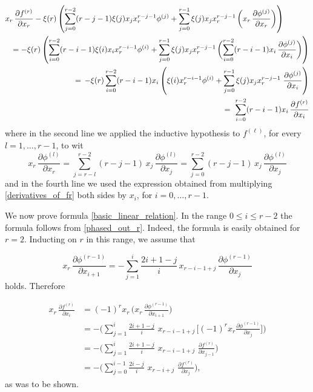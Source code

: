 \documentclass[11pt]{article}   %
\theoremstyle{definition}
\numberwithin{Theorem}{section} \numberwithin{equation}{section}
\begin{document}
{\begin{eqnarray*}\label{derivative_of_order_last}
\lefteqn{ x_r\,\frac{\partial f^{(r)}}{\partial x_r} -\xi(r)\left(\sum_{j=0}^{r-2}(r-j-1)\xi({j}) x_j
x_r^{r-j-1}\phi^{(j)} +\sum_{j=0}^{r-1}\xi({j}) x_j x_r^{r-j-1}\,
\biggl(x_r\,\frac{\partial \phi^{(j)}}{\partial x_r}\biggr)\right)}\\
&&=-\xi(r)\left(\sum_{i=0}^{r-2}(r-i-1)\xi(i)x_ix_r^{r-i-1}\phi^{(i)}+
    \sum_{j=0}^{r-1}\xi({j}) x_j x_r^{r-j-1}\, \biggl(\sum_{i=0}^{r-2} (r-i-1)x_i\,
    \frac{\partial \phi^{(j)}}{\partial x_i}\biggr) \right)\\
&&=\,-\xi(r)\sum_{i=0}^{r-2}(r-i-1)x_i\left(\xi(i)x_r^{r-i-1}\phi^{(i)}+
    \sum_{j=0}^{r-1}\xi({j}) x_j x_r^{r-j-1}\, \,
    \frac{\partial \phi^{(j)}}{\partial x_i} \right)\\
    && =\,\,\sum_{i=0}^{r-2}(r-i-1)x_i\, \frac{\partial
f^{(r)}}{\partial x_i}
\end{eqnarray*}
where in the second line we applied the inductive hypothesis to $f^ {(\ell)}$,
for every $l=1,\ldots, r-1$, to wit
\begin{equation}\label{exact_linear_relation_for_induction}
x_r\, \frac{\partial \phi^{(l)}}{\partial
x_r}=\sum_{j=r-l}^{r-2}(r-j-1)\,x_j\,\frac{\partial
\phi^{(l)}}{\partial x_j}=\sum_{j=0}^{r-2}(r-j-1)\,x_j\,\frac{\partial
\phi^{(l)}}{\partial x_j}
\end{equation}
and in the fourth line we used the expression
obtained from multiplying \eqref{derivatives_of_fr} both sides by
$x_i$, for $i=0,\ldots, r-1$.

We now prove formula \eqref{basic_linear_relation}. In the range
$0\leq i\leq r-2$ the formula follows from \eqref{phased_out_r}.
Indeed, the formula is easily obtained for $r=2$. Inducting on $r$
in this range, we assume that

\begin{equation}\label{basic_linear_relation_shifted}
x_r\,\frac{\partial \phi^{(r-1)}}{\partial
x_{i+1}}=-\sum_{j=1}^{i}\frac{2i+1-j}{i}\, x_{r-i-1+j}\,
\frac{\partial \phi^{(r-1)}}{\partial x_j}
\end{equation}
holds. Therefore

\begin{align*}
x_r\,\frac{\partial f^{(r)}}{\partial
x_i}&=(-1)^rx_r\,\biggl(x_r\,\frac{\partial \phi^{(r-1)}}{\partial
x_{i+1}}\biggr)\\
&=-\biggl(\sum_{j=1}^{i}\frac{2i+1-j}{i}\,\, x_{r-i-1+j}\,
\biggl[(-1)^rx_r\frac{\partial \phi^{(r-1)}}{\partial x_j}\biggr]\biggr)\\
&=-\biggl(\sum_{j=1}^{i}\frac{2i+1-j}{i}\,\, x_{r-i-1+j}\,\,\frac{\partial f^{(r)}}{\partial x_{j-1}}\biggr)\\
&=-\biggl(\sum_{j=0}^{i-1}\frac{2i-j}{i} \,\,
x_{r-i+j}\,\,\frac{\partial f^{(r)}}{\partial x_{j}}\biggr),
\end{align*}
as was to be shown.

}
\end{document}
